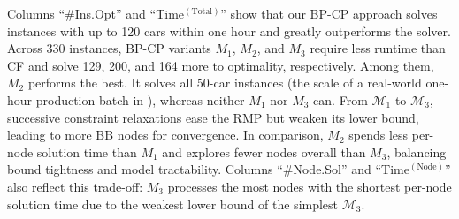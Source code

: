 \documentclass[12pt]{article}
\begin{document}




Columns ``\#Ins.Opt'' and ``Time$^{(\text{Total})}$'' show that our BP-CP approach solves instances with up to 120 cars within one hour and greatly outperforms the solver. Across 330 instances, BP-CP variants $M_1$, $M_2$, and $M_3$ require less runtime than CF and solve 129, 200, and 164 more to optimality, respectively. Among them, $M_2$ performs the best. It solves all 50-car instances (the scale of a real-world one-hour production batch in \citet{guo2025logic}), whereas neither $M_1$ nor $M_3$ can. From $\mathcal{M}_1$ to $\mathcal{M}_3$, successive constraint relaxations ease the RMP but weaken its lower bound, leading to more BB nodes for convergence. In comparison, $M_2$ spends less per-node solution time than $M_1$ and explores fewer nodes overall than $M_3$, balancing bound tightness and model tractability. Columns ``\#Node.Sol'' and ``Time$^{(\text{Node})}$'' also reflect this trade-off: $M_3$ processes the most nodes with the shortest per-node solution time due to the weakest lower bound of the simplest $\mathcal{M}_3$.
\end{document}
